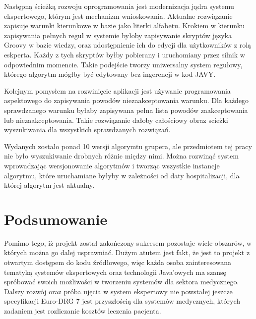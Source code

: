 Następną ścieżką rozwoju oprogramowania jest modernizacja jądra systemu ekspertowego, którym jest mechanizm wnioskowania. Aktualne rozwiązanie zapisuje warunki kierunkowe w bazie jako literki alfabetu. Krokiem w kierunku zapisywania pełnych reguł w systemie byłoby zapisywanie skryptów języka Groovy w bazie wiedzy, oraz udostępnienie ich do edycji dla użytkowników z rolą eskperta. Każdy z tych skryptów byłby pobierany i uruchomiany przez silnik w odpowiednim momencie.
Takie podejście tworzy uniwersalny system regułowy, którego algorytm mógłby być edytowany bez ingerencji w kod JAVY.

Kolejnym pomysłem na rozwinięcie aplikacji jest używanie programowania aspektowego do zapisywania powodów niezaakceptowania warunku.
Dla każdego sprawdzanego warunku byłaby zapisywana pełna lista powodów zaakceptowania lub niezaakceptowania.
Takie rozwiązanie dałoby całościowy obraz scieżki wyszukiwania dla wszystkich sprawdzanych rozwiązań.

Wydanych zostało ponad 10 wersji algorymtu grupera, ale przedmiotem tej pracy nie było wyszukiwanie drobnych różnic między nimi. Można rozwinąć system wprowadzając wersjonowanie algorytmów i tworząc wszystkie instancje algorytmu, które uruchamiane byłyby w zależności od daty hospitalizacji, dla której algorytm jest aktualny.


\section{Podsumowanie}
\label{sec:podsumowanie}

Pomimo tego, iż projekt został zakończony sukcesem pozostaje wiele obszarów, w których można go dalej usprawniać. Dużym atutem jest fakt, że jest to projekt z otwartym dostępem do kodu źródłowego, więc każda osoba zainteresowana tematyką systemów ekspertowych oraz technologii Java'owych ma szansę spróbować swoich możliwości w tworzeniu systemów dla sektora medycznego. Dalszy rozwój oraz próba ujęcia w system ekspertowy nie powstałej jeszcze specyfikacji Euro-DRG 7 jest przyszłością dla systemów medycznych, których zadaniem jest rozliczanie kosztów leczenia pacjenta.

